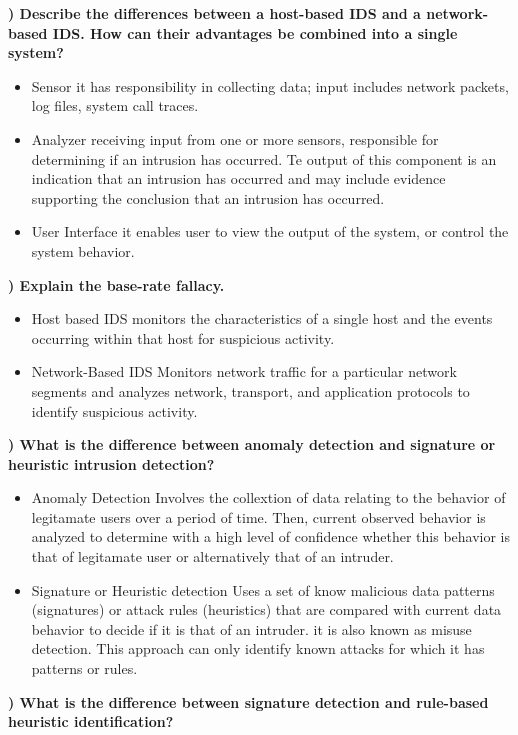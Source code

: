 \documentclass{report}
\newcommand{\mysubsection}[2]{\textbf{\romannumeral #1) #2}}
\begin{document}
\noindent\mysubsection{4}{Describe the differences between a host-based IDS and a network-based IDS. How can their advantages be combined into a single system?}
\begin{itemize}
  \item{Sensor} it has responsibility in collecting data; input includes
    network packets, log files, system call traces.
  \item{Analyzer} receiving input from one or more sensors, responsible for
    determining if an intrusion has occurred. Te output of this component is
    an indication that an intrusion has occurred and may include evidence
    supporting the conclusion that an intrusion has occurred.
  \item{User Interface} it enables user to view the output of the system, or
    control the system behavior.
\end{itemize}

\noindent\mysubsection{5}{Explain the base-rate fallacy.}
\begin{itemize}
  \item{Host based IDS} monitors the characteristics of a single host and the
    events occurring within that host for suspicious activity.
  \item{Network-Based IDS} Monitors network traffic for a particular network
    segments and analyzes network, transport, and application protocols to
    identify suspicious activity.
\end{itemize}


\noindent\mysubsection{6}{What is the difference between anomaly detection and signature or heuristic intrusion detection?}
\begin{itemize}
  \item{Anomaly Detection} Involves the collextion of data relating to the
    behavior of legitamate users over a period of time. Then, current observed
    behavior is analyzed to determine with a high level of confidence whether
    this behavior is that of legitamate user or alternatively that of an
    intruder.
  \item{Signature or Heuristic detection} Uses a set of know malicious data
    patterns (signatures) or attack rules (heuristics) that are compared with
    current data behavior to decide if it is that of an intruder. it is also
    known as misuse detection. This approach can only identify known attacks
    for which it has patterns or rules.
\end{itemize}


\noindent\mysubsection{7}{What is the difference between signature detection and rule-based heuristic identification?}
\end{document}
